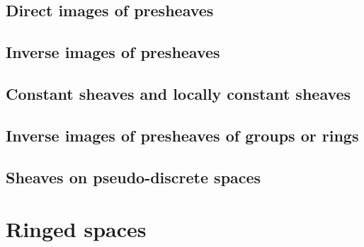 \documentclass{book}
\begin{document}
        \subsection{Direct images of presheaves}

        \label{0-prelim-3.4}

        



        \subsection{Inverse images of presheaves}

        \label{0-prelim-3.5}

        



        \subsection{Constant sheaves and locally constant sheaves}

        \label{0-prelim-3.6}

        



        \subsection{Inverse images of presheaves of groups or rings}

        \label{0-prelim-3.7}

        



        \subsection{Sheaves on pseudo-discrete spaces}

        \label{0-prelim-3.8}

        



    \section{Ringed spaces}

    \label{0-prelim-4}
\end{document}
